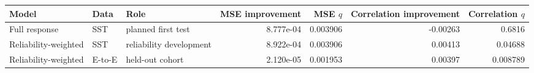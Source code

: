 \begin{tabular}{@{}lllrrrr@{}}
\toprule
Model & Data & Role & MSE improvement & MSE $q$ & Correlation improvement & Correlation $q$ \\
\midrule
Full response & SST & planned first test & 8.777e-04 & 0.003906 & -0.00263 & 0.6816 \\
Reliability-weighted & SST & reliability development & 8.922e-04 & 0.003906 & 0.00413 & 0.04688 \\
Reliability-weighted & E-to-E & held-out cohort & 2.120e-05 & 0.001953 & 0.00397 & 0.008789 \\
\bottomrule
\end{tabular}
